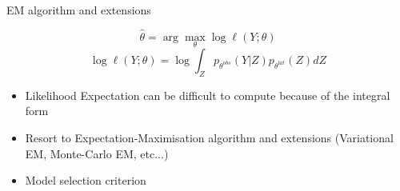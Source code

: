 \documentclass[compress,10pt]{beamer}
\begin{document}
\begin{frame}{EM algorithm and extensions}

$$\widehat{\theta} =  \arg \max_\theta \log \ell(Y; \theta)$$
$$ \log \ell(Y; \theta) = \log \int_Z p_{\theta^{obs}}(Y | Z)p_{\theta^{lat}}( Z) dZ$$


\begin{itemize}
 \item Likelihood Expectation can be difficult to compute because of the integral form  
 \item Resort to Expectation-Maximisation algorithm  \cite{dempster77} and extensions (Variational EM, Monte-Carlo EM, etc...)
 \item Model selection criterion
\end{itemize}


\end{frame}
 
\end{document}
